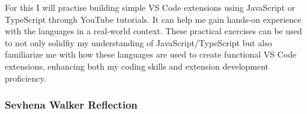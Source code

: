 \documentclass[12pt]{article}
\begin{document}
\begin{itemize}[label={}, wide=0pt, leftmargin=*]
    For this I will practise building simple VS Code extensions using
    JavaScript or TypeScript through YouTube tutorials. It can help
    me gain hands-on experience with the languages in a real-world
    context. These practical exercises can be used to not only
    solidfiy my understanding of JavaScript/TypeScript but also
    familiarize me with how these languages are used to create
    functional VS Code extensions, enhancing both my coding skills
    and extension development proficiency.

\end{itemize}

\subsubsection*{Sevhena Walker Reflection}
\medskip
\end{document}
